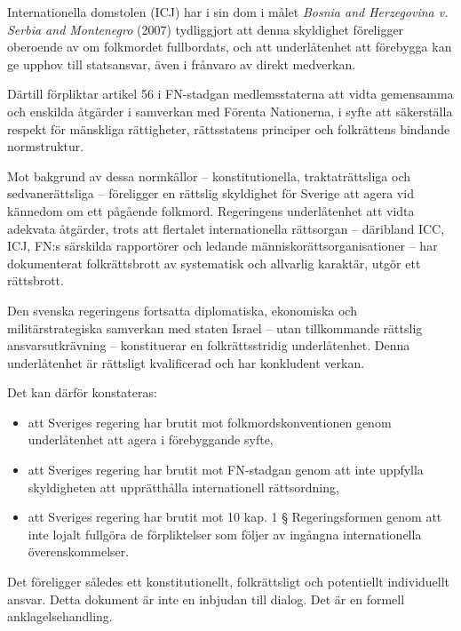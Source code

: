 Internationella domstolen (ICJ) har i sin dom i målet \textit{Bosnia and Herzegovina v. Serbia and Montenegro} (2007) tydliggjort att denna skyldighet föreligger oberoende av om folkmordet fullbordats, och att underlåtenhet att förebygga kan ge upphov till statsansvar, även i frånvaro av direkt medverkan.

Därtill förpliktar artikel 56 i FN-stadgan medlemsstaterna att vidta gemensamma och enskilda åtgärder i samverkan med Förenta Nationerna, i syfte att säkerställa respekt för mänskliga rättigheter, rättsstatens principer och folkrättens bindande normstruktur.


\medskip

Mot bakgrund av dessa normkällor – konstitutionella, traktaträttsliga och sedvanerättsliga – föreligger en rättslig skyldighet för Sverige att agera vid kännedom om ett pågående folkmord. Regeringens underlåtenhet att vidta adekvata åtgärder, trots att flertalet internationella rättsorgan – däribland ICC, ICJ, FN:s särskilda rapportörer och ledande människorättsorganisationer – har dokumenterat folkrättsbrott av systematisk och allvarlig karaktär, utgör ett rättsbrott.

Den svenska regeringens fortsatta diplomatiska, ekonomiska och militärstrategiska samverkan med staten Israel – utan tillkommande rättslig ansvarsutkrävning – konstituerar en folkrättsstridig underlåtenhet. Denna underlåtenhet är rättsligt kvalificerad och har konkludent verkan.

\medskip

Det kan därför konstateras:

\begin{itemize}
  \item att Sveriges regering har brutit mot folkmordskonventionen genom underlåtenhet att agera i förebyggande syfte,
  \item att Sveriges regering har brutit mot FN-stadgan genom att inte uppfylla skyldigheten att upprätthålla internationell rättsordning,
  \item att Sveriges regering har brutit mot 10 kap. 1 § Regeringsformen genom att inte lojalt fullgöra de förpliktelser som följer av ingångna internationella överenskommelser.
\end{itemize}

\medskip

Det föreligger således ett konstitutionellt, folkrättsligt och potentiellt individuellt ansvar.  
Detta dokument är inte en inbjudan till dialog.  
Det är en formell anklagelsehandling.
